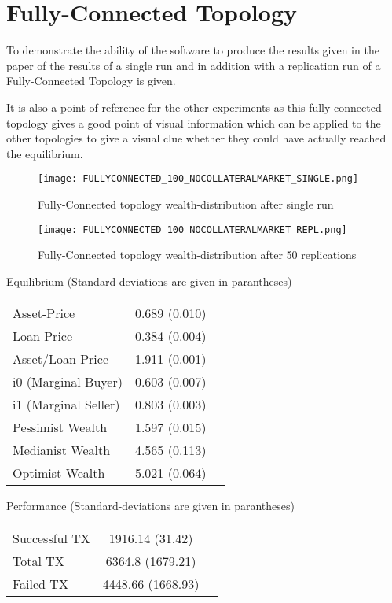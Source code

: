 \documentclass[Bachelorarbeit.tex]{subfiles}
\begin{document}
\section{Fully-Connected Topology}
To demonstrate the ability of the software to produce the results given in the paper of \cite{Breuer2015} the results of a single run and in addition with a replication run of a Fully-Connected Topology is given.

It is also a point-of-reference for the other experiments as this fully-connected topology gives a good point of visual information which can be applied to the other topologies to give a visual clue whether they could have actually reached the equilibrium.

\begin{figure}[ht]
	\centering
  \texttt{[image: FULLYCONNECTED\_100\_NOCOLLATERALMARKET\_SINGLE.png]}
	\caption{Fully-Connected topology wealth-distribution after single run}
	\label{fig1}
\end{figure}

\begin{figure}[ht]
	\centering
  \texttt{[image: FULLYCONNECTED\_100\_NOCOLLATERALMARKET\_REPL.png]}
	\caption{Fully-Connected topology wealth-distribution after 50 replications}
	\label{fig1}
\end{figure}

Equilibrium (Standard-deviations are given in parantheses)

\begin{tabular} { l c r }
	Asset-Price & 0.689 (0.010) \\
	Loan-Price & 0.384 (0.004) \\
	Asset/Loan Price & 1.911 (0.001) \\
	i0 (Marginal Buyer) & 0.603 (0.007) \\
	i1 (Marginal Seller) & 0.803 (0.003) \\
	Pessimist Wealth & 1.597 (0.015) \\
	Medianist Wealth & 4.565 (0.113) \\
	Optimist Wealth & 5.021 (0.064) \\
\end{tabular}

Performance (Standard-deviations are given in parantheses)

\begin{tabular} { l c r }
	Successful TX & 1916.14 (31.42) \\
	Total TX & 6364.8 (1679.21) \\
	Failed TX & 4448.66 (1668.93) \\
\end{tabular}
\end{document}
